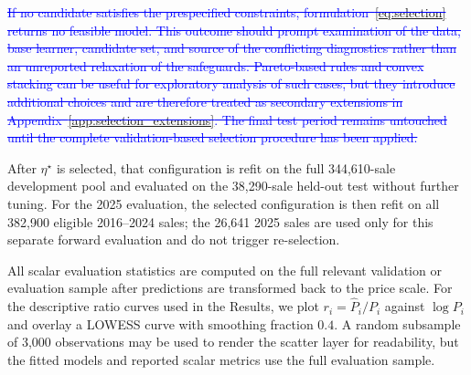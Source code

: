 \documentclass[10pt]{article}
\theoremstyle{definition}
\newcommand{\1}{\mathbf{1}}
\begin{document}
{{\textcolor{blue}{\sout{If no candidate satisfies the prespecified constraints, formulation~\eqref{eq:selection} returns no feasible model. This outcome should prompt examination of the data, base learner, candidate set, and source of the conflicting diagnostics rather than an unreported relaxation of the safeguards. Pareto-based rules and convex stacking can be useful for exploratory analysis of such cases, but they introduce additional choices and are therefore treated as secondary extensions in Appendix~\ref{app:selection_extensions}. The final test period remains untouched until the complete validation-based selection procedure has been applied.}}

\textcolor{impGreen}{After $\eta^\star$ is selected, that configuration is refit on the full 344,610-sale development pool and evaluated on the 38,290-sale held-out test without further tuning. For the 2025 evaluation, the selected configuration is then refit on all 382,900 eligible 2016--2024 sales; the 26,641 2025 sales are used only for this separate forward evaluation and do not trigger re-selection.}

\textcolor{impGreen}{All scalar evaluation statistics are computed on the full relevant validation or evaluation sample after predictions are transformed back to the price scale. For the descriptive ratio curves used in the Results, we plot $r_i=\widehat P_i/P_i$ against $\log P_i$ and overlay a LOWESS curve with smoothing fraction $0.4$. A random subsample of 3,000 observations may be used to render the scatter layer for readability, but the fitted models and reported scalar metrics use the full evaluation sample.}

}}
\end{document}
